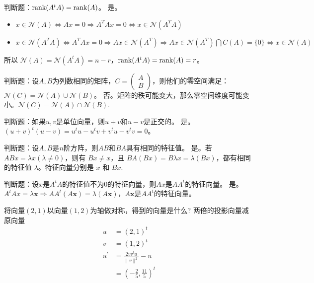 \begin{problem}
	判断题：$\rank(A^tA)=\rank(A)$。
	\solution 是。\begin{itemize}
		\item $x \in \mathcal{N}(A) \Longleftrightarrow A x=0 \Longrightarrow A^{T} A x=0 \Longleftrightarrow x \in \mathcal{N}(A^TA)$
		\item $x \in \mathcal{N}(A^TA) \Longleftrightarrow A^{T} A x=0 \Longrightarrow A x \in \mathcal{N}\left(A^{T}\right) \Longrightarrow A x \in \mathcal{N}\left(A^{T}\right) \bigcap C(A)=\{0\} \Longleftrightarrow x \in \mathcal{N}(A)$
	\end{itemize}
	所以 $\mathcal{N}(A) = \mathcal{N}(A^tA) = n - r$，$\rank(A^tA) = \rank(A) = r$。
\end{problem}

\begin{problem}
	判断题：设$A,B$为列数相同的矩阵，$C=\begin{pmatrix}A\\B\end{pmatrix}$，则他们的零空间满足：$\mathcal{N}(C)=\mathcal{N}(A)\cup \mathcal{N}(B)$。
	\solution 否。矩阵的秩可能变大，那么零空间维度可能变小。$\mathcal{N}(C) = \mathcal{N}(A)\cap \mathcal{N}(B)$.
\end{problem}

\begin{problem}
	判断题：如果$u,v$是单位向量，则$u+v$和$u-v$是正交的。
	\solution 是。$(u + v)^t(u - v) = u^tu - u^tv + v^tu - v^tv = 0$。
\end{problem}

\begin{problem}
	判断题：设$A,B$是$n$阶方阵，则$AB$和$BA$具有相同的特征值。
	\solution 是。若 $ABx = \lambda x(\lambda \neq 0)$，则有 $Bx \neq x$，且 $BA(Bx) = B\lambda x = \lambda (Bx)$，都有相同的特征值 $\lambda$。特征向量分别是 $x$ 和 $Bx$.
\end{problem}

\begin{problem}
	判断题：设$x$是$A^tA$的特征值不为$0$的特征向量，则$Ax$是$AA^t$的特征向量。
	\solution 是。$A^tAx = \lambda\boldsymbol{x} \Longrightarrow AA^t(A\boldsymbol{x}) = \lambda (A\boldsymbol{x})$，$A\boldsymbol{x}$是$AA^t$的特征向量。
\end{problem}

\begin{problem}
	将向量$(2,1)$以向量$(1,2)$为轴做对称，得到的向量是什么?
	\solution 两倍的投影向量减原向量
	\begin{align*}
		u &= (2, 1)^t\\
		v &= (1, 2)^t\\
		u^\prime &= \frac{2vv^tu}{\|v\|^2} - u\\
		&=\left(-\frac{2}{5}, \frac{11}{5}\right)^t
	\end{align*}
\end{problem}

